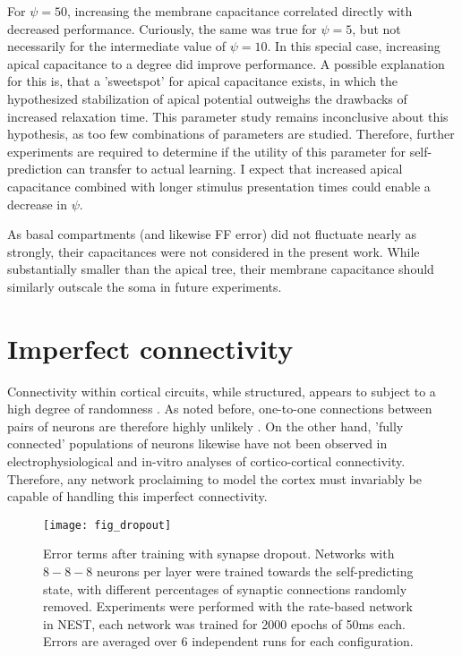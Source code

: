 For $\psi=50$, increasing the membrane capacitance correlated directly with decreased performance. Curiously, the same
was true for $\psi=5$, but not necessarily for the intermediate value of $\psi=10$. In this special case, increasing
apical capacitance to a degree did improve performance. A possible explanation for this is, that a 'sweetspot' for
apical capacitance exists, in which the hypothesized stabilization of apical potential outweighs the drawbacks of
increased relaxation time. This parameter study remains inconclusive about this hypothesis, as too few combinations of
parameters are studied. Therefore, further experiments are required to determine if the utility of this parameter for
self-prediction can transfer to actual learning. I expect that increased apical capacitance combined with longer
stimulus presentation times could enable a decrease in $\psi$.


As basal compartments (and likewise FF error) did not fluctuate nearly as strongly, their capacitances were not
considered in the present work. While substantially smaller than the apical tree, their membrane capacitance should
similarly outscale the soma in future experiments.


\section{Imperfect connectivity}

Connectivity within cortical circuits, while structured, appears to subject to a high degree of randomness
\citep{potjans2014cell}. As noted before, one-to-one connections between pairs of neurons are therefore highly unlikely
\citep{whittington2019theories}. On the other hand, 'fully connected' populations of neurons likewise have not been
observed in electrophysiological \citep{thomson2002synaptic} and in-vitro \citep{binzegger2004quantitative} analyses of
cortico-cortical connectivity. Therefore, any network proclaiming to model the cortex must invariably be capable of
handling this imperfect connectivity.

\begin{figure}[h]
    \centering
    \texttt{[image: fig\_dropout]}
    \caption[Error terms after training with synapse dropout]{Error terms after training with synapse dropout. Networks
        with $8-8-8$ neurons per layer were trained towards the self-predicting state, with different percentages of
        synaptic connections randomly removed. Experiments were performed with the rate-based network in NEST, each
        network was trained for 2000 epochs of 50ms each. Errors are averaged over 6 independent runs for each
        configuration.}
    \label{fig-dropout}
\end{figure}

